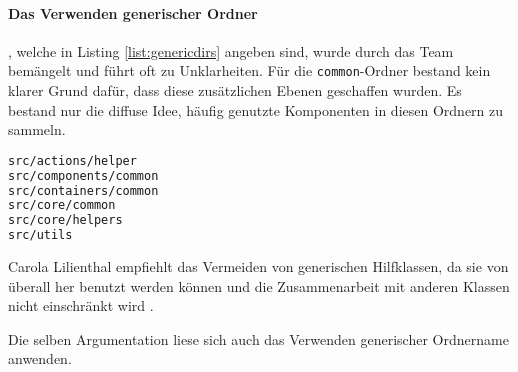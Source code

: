 \paragraph{Das Verwenden generischer Ordner}, welche in Listing \ref{list:genericdirs} angeben sind, wurde durch das Team bemängelt und führt oft zu Unklarheiten. Für die \lstinline|common|-Ordner bestand kein klarer Grund dafür, dass diese zusätzlichen Ebenen geschaffen wurden. Es bestand nur die diffuse Idee, häufig genutzte Komponenten in diesen Ordnern zu sammeln. 

\begin{lstlisting}[language={sh}, label=list:genericdirs, caption=generische Ordner die innerhalb des FreeDesign-Projektes genutzt werden]
src/actions/helper
src/components/common
src/containers/common
src/core/common
src/core/helpers
src/utils
\end{lstlisting}

Carola Lilienthal empfiehlt das Vermeiden von generischen Hilfklassen, da sie von überall her benutzt werden können und die Zusammenarbeit mit anderen Klassen nicht einschränkt wird \autocite[vgl.][159]{Lilienthal2019}. 

Die selben Argumentation liese sich auch das Verwenden generischer Ordnername anwenden. 


